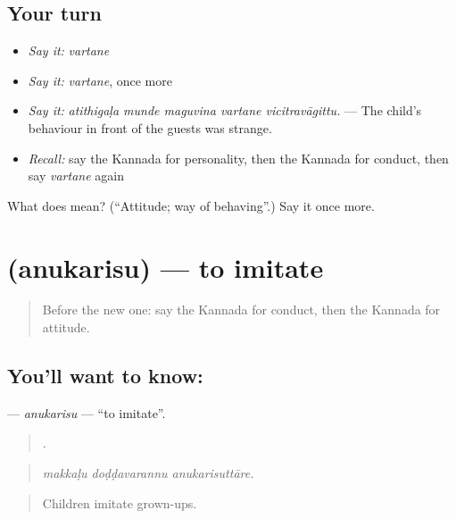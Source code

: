 \subsection*{Your turn}
\begin{itemize}
\raggedright
  \item \emph{Say it:} \emph{vartane}
  \item \emph{Say it:} \emph{vartane}, once more
  \item \emph{Say it:} \emph{atithigaḷa munde maguvina vartane vicitravāgittu.} — The child's behaviour in front of the guests was strange.
  \item \emph{Recall:} say the Kannada for personality, then the Kannada for conduct, then say \emph{vartane} again
\end{itemize}

\begin{tcolorbox}[breakable,colback=teal!4,colframe=teal!35!black,title={Before you move on}]
What does  mean? (\textquotedblleft{}Attitude; way of behaving\textquotedblright{}.) Say it once more.
\end{tcolorbox}
\section[\texorpdfstring{\kn{ಅನುಕರಿಸು} (anukarisu)}{ಅನುಕರಿಸು (anukarisu)}]{ (anukarisu) — to imitate}

\label{lesson:KA-C500-anukarisu}



\begin{quote}
Before the new one: say the Kannada for conduct, then the Kannada for attitude.
\end{quote}

\subsection*{You'll want to know: }
\textbf{} — \emph{anukarisu} — \textquotedblleft{}to imitate\textquotedblright{}.

\begin{quote}
  .
\end{quote}

\begin{quote}
\emph{makkaḷu doḍḍavarannu anukarisuttāre.}
\end{quote}

\begin{quote}
Children imitate grown-ups.
\end{quote}

